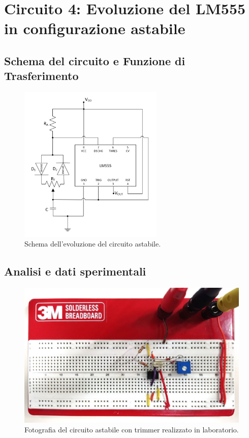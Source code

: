 \documentclass{report}
\begin{document}
\section{Circuito 4: Evoluzione del LM555 in configurazione astabile}
\subsection{Schema del circuito e Funzione di Trasferimento}
\begin{figure}[h!]
	\centering
	\includegraphics[height=7.5cm]{immagini/schema4}
	\caption{Schema dell'evoluzione del circuito astabile.}
	\label{figura:schema4}
\end{figure}
\subsection{Analisi e dati sperimentali}
\begin{figure}[h!]
	\centering
	\includegraphics[height=7cm]{immagini/circuito4}
	\caption{Fotografia del circuito astabile con trimmer realizzato in laboratorio.}
	\label{figura:circuito4}
\end{figure}

\end{document}
